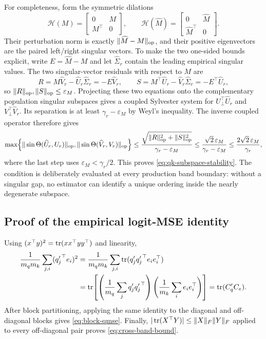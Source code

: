 For completeness, form the symmetric dilations
\begin{equation}
 \mathcal H(M)=
 \begin{bmatrix}0&M\\M^\top&0\end{bmatrix},
 \qquad
 \mathcal H(\widehat M)=
 \begin{bmatrix}0&\widehat M\\\widehat M^\top&0\end{bmatrix}.
\end{equation}
Their perturbation norm is exactly $\|\widehat M-M\|_{\mathrm{op}}$, and their
positive eigenvectors are the paired left/right singular vectors.  To make
the two one-sided bounds explicit, write $E=\widehat M-M$ and let
$\widehat\Sigma_r$ contain the leading empirical singular values.  The two
singular-vector residuals with respect to $M$ are
\begin{equation}
 R=M\widehat V_r-\widehat U_r\widehat\Sigma_r
   =-E\widehat V_r,\qquad
 S=M^\top\widehat U_r-\widehat V_r\widehat\Sigma_r
   =-E^\top\widehat U_r,
\end{equation}
so $\|R\|_{\mathrm{op}},\|S\|_{\mathrm{op}}\le\varepsilon_M$.
Projecting these two equations onto the complementary population singular
subspaces gives a coupled Sylvester system for
$U_\perp^\top\widehat U_r$ and $V_\perp^\top\widehat V_r$.
Its separation is at least $\gamma_r-\varepsilon_M$ by Weyl's inequality.
The inverse coupled operator therefore gives
\begin{equation}
 \max\!\left\{
 \|\sin\Theta(\widehat U_r,U_r)\|_{\mathrm{op}},
 \|\sin\Theta(\widehat V_r,V_r)\|_{\mathrm{op}}
 \right\}
 \le
 \frac{\sqrt{\|R\|_{\mathrm{op}}^2+\|S\|_{\mathrm{op}}^2}}
      {\gamma_r-\varepsilon_M}
 \le\frac{\sqrt{2}\,\varepsilon_M}{\gamma_r-\varepsilon_M}
 \le\frac{2\sqrt{2}\,\varepsilon_M}{\gamma_r},
\end{equation}
where the last step uses $\varepsilon_M<\gamma_r/2$.  This proves
\cref{eq:qk-subspace-stability}.  The condition is deliberately evaluated
at every production band boundary: without a singular gap, no estimator can
identify a unique ordering inside the nearly degenerate subspace.

\subsection{Proof of the empirical logit-MSE identity}

Using $(x^\top y)^2=\operatorname{tr}(xx^\top yy^\top)$ and linearity,
\begin{align}
 \frac{1}{m_qm_k}\sum_{j,i}({q'_j}^\top e_i)^2
 &=\frac{1}{m_qm_k}\sum_{j,i}
   \operatorname{tr}(q'_j{q'_j}^\top e_ie_i^\top)\\
 &=\operatorname{tr}\!\left[
   \left(\frac1{m_q}\sum_jq'_j{q'_j}^\top\right)
   \left(\frac1{m_k}\sum_ie_ie_i^\top\right)\right]
 =\operatorname{tr}(C'_qC_e).
\end{align}
After block partitioning, applying the same identity to the diagonal and
off-diagonal blocks gives \cref{eq:block-qmse}.
Finally,
$|\operatorname{tr}(X^\top Y)|\le\|X\|_F\|Y\|_F$ applied to every off-diagonal pair proves
\cref{eq:cross-band-bound}.

